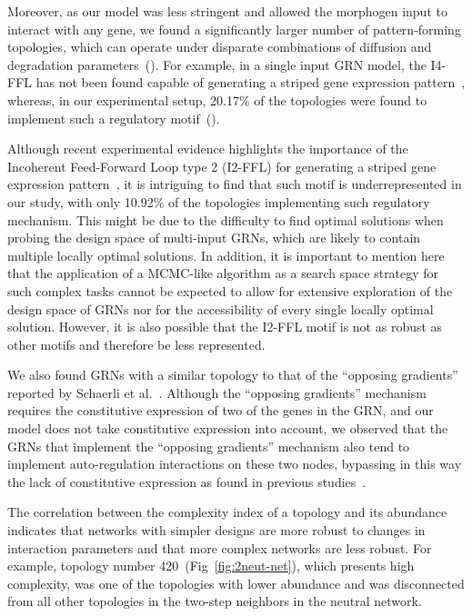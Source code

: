 \documentclass[10pt,letterpaper]{article}
\begin{document}
Moreover, as our model was less stringent and allowed the morphogen input to
interact with any gene, we found a significantly larger number of pattern-forming
topologies, which can operate under disparate combinations of diffusion and degradation
parameters~(). For example, in a single input GRN model, the I4-FFL
has not been found capable of generating a striped gene expression
pattern~\cite{munteanu_2014}, whereas, in our experimental setup, 20.17\% of
the topologies were found  to implement such a regulatory motif~().

Although recent experimental evidence highlights the importance of the Incoherent
Feed-Forward Loop type 2 (I2-FFL) for generating a striped gene expression
pattern~\cite{Schaerli2014, Basu2005}, it is intriguing to find that such motif is
underrepresented in our study, with only 10.92\% of the topologies implementing
such regulatory mechanism. This might be due to the difficulty to find optimal
solutions when probing the design space of multi-input GRNs, which are likely to
contain multiple locally optimal solutions. In addition, it is important to mention
here that the application of a MCMC-like algorithm as a search space strategy for
such complex tasks cannot be expected to allow for extensive exploration of the
design space of GRNs nor for the accessibility of every single locally optimal
solution. However, it is also possible that the I2-FFL motif is not as robust as
other motifs and therefore be less represented.

We also found GRNs with a similar topology to that of the “opposing
gradients” reported by Schaerli et al.~\cite{Schaerli2018,Schaerli2014}.
Although the “opposing gradients” mechanism requires the constitutive expression
of two of the genes in the GRN, and our model does not take constitutive
expression into account, we observed that the GRNs that implement the “opposing
gradients” mechanism also tend to implement auto-regulation interactions on
these two nodes, bypassing in this way the lack of constitutive
expression as found in previous studies~\cite{munteanu_2014}.

The correlation between the complexity index of a topology and its abundance
indicates that networks with simpler designs are more robust to changes in
interaction parameters and that more complex networks are less robust. For
example, topology number 420~(Fig~\ref{fig:2neut-net}), which
presents high complexity, was one of the
topologies with lower abundance and was disconnected from all other topologies
in the two-step neighbors in the neutral network.
\end{document}
